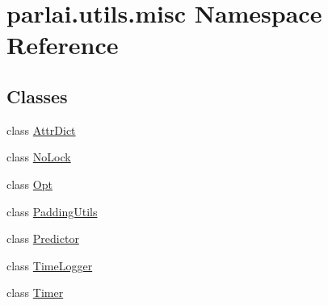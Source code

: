 \hypertarget{namespaceparlai_1_1utils_1_1misc}{}\section{parlai.\+utils.\+misc Namespace Reference}
\label{namespaceparlai_1_1utils_1_1misc}
\subsection*{Classes}
\begin{DoxyCompactItemize}
\item 
class \hyperlink{classparlai_1_1utils_1_1misc_1_1AttrDict}{Attr\+Dict}
\item 
class \hyperlink{classparlai_1_1utils_1_1misc_1_1NoLock}{No\+Lock}
\item 
class \hyperlink{classparlai_1_1utils_1_1misc_1_1Opt}{Opt}
\item 
class \hyperlink{classparlai_1_1utils_1_1misc_1_1PaddingUtils}{Padding\+Utils}
\item 
class \hyperlink{classparlai_1_1utils_1_1misc_1_1Predictor}{Predictor}
\item 
class \hyperlink{classparlai_1_1utils_1_1misc_1_1TimeLogger}{Time\+Logger}
\item 
class \hyperlink{classparlai_1_1utils_1_1misc_1_1Timer}{Timer}
\end{DoxyCompactItemize}
